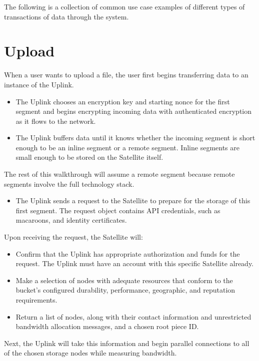 \documentclass[8pt,fleqn,openany]{book}
\begin{document}
The following is a collection of common use case examples of different types of
transactions of data through the system.

\section{Upload}

When a user wants to upload a file, the user first begins transferring data to
an instance of the Uplink.

\begin{itemize}
\item The Uplink chooses an encryption key and starting nonce for
  the first segment and begins encrypting incoming data with authenticated
  encryption as it flows to the network.
\item The Uplink buffers data until it knows whether the incoming segment is
short enough to be an inline segment or a remote segment. Inline segments are
small enough to be stored on the Satellite itself.
\end{itemize}

The rest of this
walkthrough will assume a remote segment because remote segments involve the
full technology stack.
\begin{itemize}
    \item The Uplink sends a request to the Satellite to prepare for the storage
of this first segment. The request object contains API credentials, such as
macaroons, and identity certificates.
\end{itemize}

Upon receiving the request, the Satellite will:
\begin{itemize}
\item Confirm that the Uplink has appropriate authorization and funds for
  the request. The Uplink must have an account with this specific Satellite
  already.
\item Make a selection of nodes with adequate resources that conform to the
  bucket's configured durability, performance, geographic, and reputation
  requirements.
\item Return a list of nodes, along with their contact information and
  unrestricted bandwidth allocation messages, and a chosen root piece ID.
\end{itemize}

Next, the Uplink will take this information and begin parallel connections to
  all of the chosen storage nodes while measuring bandwidth.
\end{document}
